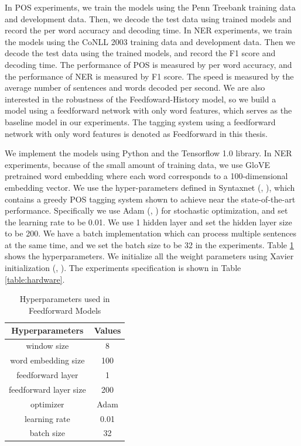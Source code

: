 In POS experiments, we train the models using the Penn Treebank training data and development data. Then, we decode the test data using trained models and record the per word accuracy and decoding time. In NER experiments, we train the models using the CoNLL 2003 training data and development data. Then we decode the test data using the trained models, and record the F1 score and decoding time. The performance of POS is measured by per word accuracy, and the performance of NER is measured by F1 score. The speed is measured by the average number of sentences and words decoded per second. We are also interested in the robustness of the Feedfoward-History model, so we build a model using a feedforward network with only word features, which serves as the baseline model in our experiments. The tagging system using a feedforward network with only word features is denoted as Feedforward in this thesis.

We implement the models using Python and the Tensorflow 1.0 library. In NER experiments, because of the small amount of training data, we use GloVE pretrained word embedding where each word corresponds to a 100-dimensional embedding vector. We use the hyper-parameters defined in Syntaxnet (\citeauthor{andor2016globally}, \citeyear{andor2016globally}), which contains a greedy POS tagging system shown to achieve near the state-of-the-art performance. Specifically we use Adam (\citeauthor{kingma2014adam}, \citeyear{kingma2014adam}) for stochastic optimization, and set the learning rate to be 0.01. We use 1 hidden layer and set the hidden layer size to be 200. We have a batch implementation which can process multiple sentences at the same time, and we set the batch size to be 32 in the experiments. Table \ref{table:hyperparameters1} shows the hyperparameters. We initialize all the weight parameters using Xavier initialization (\citeauthor{glorot2011domain}, \citeyear{glorot2011domain}). The experiments specification is shown in Table \ref{table:hardware}.

\begin{table}[]
\centering
\caption{Hyperparameters used in Feedforward Models}
\label{table:hyperparameters1}
\begin{tabular}{|c|c|}
\hline
Hyperparameters & Values \\ \hline
window size   & 8 \\ \hline
word embedding size & 100 \\ \hline
feedforward layer & 1 \\ \hline
feedforward layer size & 200 \\ \hline
optimizer & Adam \\ \hline
learning rate & 0.01 \\ \hline
batch size & 32 \\ \hline
\end{tabular}
\end{table}

